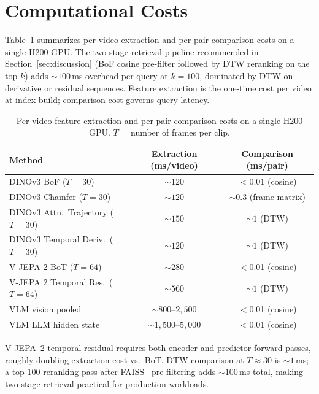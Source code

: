\documentclass{article}
\theoremstyle{remark}
\begin{document}
\section{Computational Costs}
\label{sec:computational_costs}

Table~\ref{tab:costs} summarizes per-video extraction and per-pair comparison costs on a single H200 GPU. The two-stage retrieval pipeline recommended in Section~\ref{sec:discussion} (BoF cosine pre-filter followed by DTW reranking on the top-$k$) adds ${\sim}100$\,ms overhead per query at $k\!=\!100$, dominated by DTW on derivative or residual sequences. Feature extraction is the one-time cost per video at index build; comparison cost governs query latency.

\begin{table}[h]
\centering
\caption{Per-video feature extraction and per-pair comparison costs on a single H200 GPU. $T$ = number of frames per clip.}
\label{tab:costs}
\begin{tabular}{lcc}
\toprule
\textbf{Method} & \textbf{Extraction (ms/video)} & \textbf{Comparison (ms/pair)} \\
\midrule
DINOv3 BoF ($T\!=\!30$) & ${\sim}120$ & $<$0.01 (cosine) \\
DINOv3 Chamfer ($T\!=\!30$) & ${\sim}120$ & ${\sim}0.3$ (frame matrix) \\
DINOv3 Attn.\ Trajectory ($T\!=\!30$) & ${\sim}150$ & ${\sim}1$ (DTW) \\
DINOv3 Temporal Deriv.\ ($T\!=\!30$) & ${\sim}120$ & ${\sim}1$ (DTW) \\
V-JEPA 2 BoT ($T\!=\!64$) & ${\sim}280$ & $<$0.01 (cosine) \\
V-JEPA 2 Temporal Res.\ ($T\!=\!64$) & ${\sim}560$ & ${\sim}1$ (DTW) \\
VLM vision pooled & ${\sim}800$--$2{,}500$ & $<$0.01 (cosine) \\
VLM LLM hidden state & ${\sim}1{,}500$--$5{,}000$ & $<$0.01 (cosine) \\
\bottomrule
\end{tabular}
\begin{flushleft}
\small V-JEPA~2 temporal residual requires both encoder and predictor forward passes, roughly doubling extraction cost vs.\ BoT. DTW comparison at $T \approx 30$ is ${\sim}1$\,ms; a top-100 reranking pass after FAISS~\cite{faiss} pre-filtering adds ${\sim}100$\,ms total, making two-stage retrieval practical for production workloads.
\end{flushleft}
\end{table}
\end{document}
